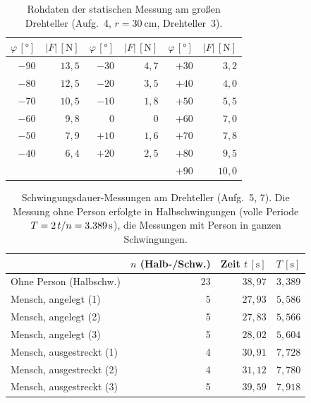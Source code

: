 \documentclass[11pt,a4paper]{article}
\begin{document}
\begin{table}[H]
\centering
\caption{Rohdaten der statischen Messung am großen Drehteller (Aufg.~4, $r=\SI{30}{\centi\metre}$, Drehteller~3).}
\label{tab:roh_stat_drehteller}
\small
\begin{tabular}{rr|rr|rr}
\toprule
$\varphi\,[\si{\degree}]$ & $\lvert F\rvert\,[\si{\newton}]$ &
$\varphi\,[\si{\degree}]$ & $\lvert F\rvert\,[\si{\newton}]$ &
$\varphi\,[\si{\degree}]$ & $\lvert F\rvert\,[\si{\newton}]$ \\
\midrule
$-90$ & $13{,}5$ & $-30$ & $4{,}7$  & $+30$ & $3{,}2$ \\
$-80$ & $12{,}5$ & $-20$ & $3{,}5$  & $+40$ & $4{,}0$ \\
$-70$ & $10{,}5$ & $-10$ & $1{,}8$  & $+50$ & $5{,}5$ \\
$-60$ & $9{,}8$  & $0$   & $0$      & $+60$ & $7{,}0$ \\
$-50$ & $7{,}9$  & $+10$ & $1{,}6$  & $+70$ & $7{,}8$ \\
$-40$ & $6{,}4$  & $+20$ & $2{,}5$  & $+80$ & $9{,}5$ \\
      &          &       &          & $+90$ & $10{,}0$ \\
\bottomrule
\end{tabular}
\end{table}

\begin{table}[H]
\centering
\caption{Schwingungsdauer-Messungen am Drehteller (Aufg.~5, 7).
  Die Messung ohne Person erfolgte in Halbschwingungen
  (volle Periode $T = 2\,t/n = \SI{3{,}389}{\second}$),
  die Messungen mit Person in ganzen Schwingungen.}
\label{tab:mensch}
\small
\begin{tabular}{lrrr}
\toprule
& $n$ (Halb-/Schw.) & Zeit $t\,[\si{\second}]$ & $T\,[\si{\second}]$ \\
\midrule
Ohne Person (Halbschw.)    & 23 & $38{,}97$ & $3{,}389$ \\
\midrule
Mensch, angelegt (1)       &  5 & $27{,}93$ & $5{,}586$ \\
Mensch, angelegt (2)       &  5 & $27{,}83$ & $5{,}566$ \\
Mensch, angelegt (3)       &  5 & $28{,}02$ & $5{,}604$ \\
\midrule
Mensch, ausgestreckt (1)   &  4 & $30{,}91$ & $7{,}728$ \\
Mensch, ausgestreckt (2)   &  4 & $31{,}12$ & $7{,}780$ \\
Mensch, ausgestreckt (3)   &  5 & $39{,}59$ & $7{,}918$ \\
\bottomrule
\end{tabular}
\end{table}
\end{document}
